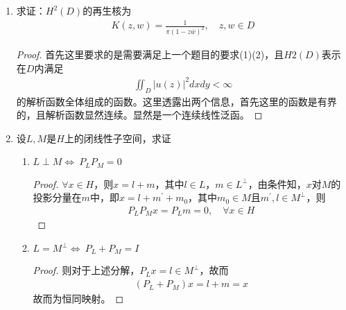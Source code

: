 \begin{enumerate}[leftmargin=2cm, label=\arabic*]
\begin{enumerate}[leftmargin=1cm, label=(\arabic*)]
		\end{enumerate}
		\begin{proof}
			我们自然的会想到利用 Riesz 表示定理，即存在唯一的$K_y \in H$，使得$J_x(f) = (f, K_y) = f(x)$。这里$K_y$依赖于$y$，我们记$k(x,y) = (ky, kx)$，则固定 $y\in S$，$K(x,y) = k_y(x)\in H$，而同理 $f(y) = (f, k_y)k_y = (f,K(\cdot, y))$。
		\end{proof}
		\item 求证：$H^2(D)$的再生核为 
		\begin{align*}
			K(z,w) = \frac{1}{\pi(1-z\overline{w})^2},\quad z,w\in D
		\end{align*}
		\begin{proof}
			首先这里要求的是需要满足上一个题目的要求(1)(2)，且$H2(D)$表示在$D$内满足
			\begin{align*}
				\iint_{D} |u(z)|^2 dxdy < \infty
			\end{align*}
			的解析函数全体组成的函数。这里透露出两个信息，首先这里的函数是有界的，且解析函数显然连续。显然是一个连续线性泛函。
		\end{proof}
		\item 设$L,M$是$H$上的闭线性子空间，求证
		\begin{enumerate}[leftmargin=1cm, label=(\arabic*)]
			\item $L\perp M\Leftrightarrow\ P_LP_M = 0$
			\begin{proof}
				$\forall x\in H$，则$x = l + m$，其中$l\in L$，$m\in L^{\perp}$，由条件知，$x$对$M$的投影分量在$m$中，即$x = l + m^{\prime} + m_0$，其中$m_0\in M$且$m^{\prime}, l \in M^{\perp}$，则
				\begin{align*}
					P_L P_M x = P_L m = 0,\quad \forall x\in H            \end{align*}
			\end{proof}
			
			\item $L = M^{\perp}\Leftrightarrow\ P_L + P_M = I$
			\begin{proof}
				则对于上述分解，$P_L x = l \in M^{\perp}$，故而
				\begin{align*}
					(P_L + P_M )x = l + m =  x
				\end{align*}
				故而为恒同映射。
			\end{proof}
			

\end{enumerate}
\end{enumerate}
